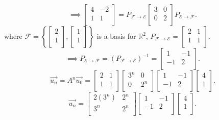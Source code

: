 \documentclass{report}
\begin{document}
\[
\implies \begin{bmatrix}
4 & -2\\
1 & 1\\
\end{bmatrix} = P _{ \mathcal{F} \to \mathcal{E} } \begin{bmatrix}
3 & 0\\
0 & 2\\
\end{bmatrix} P _{ \mathcal{E} \to \mathcal{F}}
.\] 
where $ \mathcal{F} = \left\{  \begin{bmatrix}
2\\
1\\
\end{bmatrix}
, \begin{bmatrix}
1\\
1\\
\end{bmatrix}
 \right\}$ is a basis for $ \mathbb{R} ^2$, $ P _{ \mathcal{F} \to \mathcal{E}}= \begin{bmatrix}
 2 & 1\\
 1 & 1\\
 \end{bmatrix}$.\\
 \[
 \implies P _{ \mathcal{E} \to \mathcal{F}} = \left( P _{ \mathcal{F} \to \mathcal{E}} \right) ^{-1} = \begin{bmatrix}
 1 & -1\\
 -1 & 2\\
 \end{bmatrix}
 .\]
 \[
 \vec{ u_n} = A ^n \vec{ u_0} =  \begin{bmatrix}
 2 & 1\\
 1 & 1\\
 \end{bmatrix} \begin{bmatrix}
 3 ^{n} & 0\\
 0 & 2 ^{n}\\
 \end{bmatrix} \begin{bmatrix}
 1 & -1\\
 -1 & 2\\
 \end{bmatrix} \begin{bmatrix}
 4\\
 1\\
 \end{bmatrix}
 .\] 
 \[
 \vec{ u_n}  = \begin{bmatrix}
 2 \left( 3 ^{n} \right)  & 2 ^{n}\\
 3^{n} & 2 ^{n}\\
 \end{bmatrix} \begin{bmatrix}
 1 & -1\\
 -1 & 2\\
 \end{bmatrix} \begin{bmatrix}
 4\\
 1\\
 \end{bmatrix}
 .\] 
\end{document}
